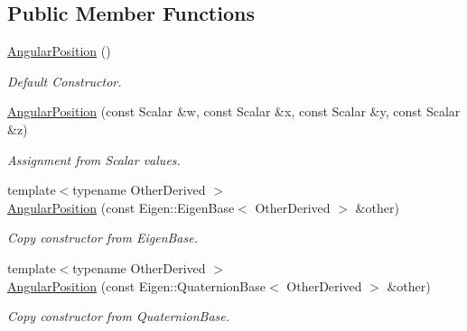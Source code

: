 \subsection*{Public Member Functions}
\begin{DoxyCompactItemize}
\item 
\hyperlink{classow__core_1_1AngularPosition_a57812720a8d02ece9fff081bcb67603a}{Angular\+Position} ()\hypertarget{classow__core_1_1AngularPosition_a57812720a8d02ece9fff081bcb67603a}{}\label{classow__core_1_1AngularPosition_a57812720a8d02ece9fff081bcb67603a}

\begin{DoxyCompactList}\small\item\em Default Constructor. \end{DoxyCompactList}\item 
\hyperlink{classow__core_1_1AngularPosition_ab219dc83bafbd964f7fd8bdc2ae9d846}{Angular\+Position} (const Scalar \&w, const Scalar \&x, const Scalar \&y, const Scalar \&z)
\begin{DoxyCompactList}\small\item\em Assignment from Scalar values. \end{DoxyCompactList}\item 
{\footnotesize template$<$typename Other\+Derived $>$ }\\\hyperlink{classow__core_1_1AngularPosition_aaf802dfe295148bc8921e0d8671fc4e9}{Angular\+Position} (const Eigen\+::\+Eigen\+Base$<$ Other\+Derived $>$ \&other)\hypertarget{classow__core_1_1AngularPosition_aaf802dfe295148bc8921e0d8671fc4e9}{}\label{classow__core_1_1AngularPosition_aaf802dfe295148bc8921e0d8671fc4e9}

\begin{DoxyCompactList}\small\item\em Copy constructor from Eigen\+Base. \end{DoxyCompactList}\item 
{\footnotesize template$<$typename Other\+Derived $>$ }\\\hyperlink{classow__core_1_1AngularPosition_ad0343736cc6a1fc3953294727b3721d6}{Angular\+Position} (const Eigen\+::\+Quaternion\+Base$<$ Other\+Derived $>$ \&other)\hypertarget{classow__core_1_1AngularPosition_ad0343736cc6a1fc3953294727b3721d6}{}\label{classow__core_1_1AngularPosition_ad0343736cc6a1fc3953294727b3721d6}

\begin{DoxyCompactList}\small\item\em Copy constructor from Quaternion\+Base. \end{DoxyCompactList}\end{DoxyCompactItemize}
